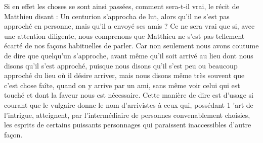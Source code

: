 Si en effet les choses se sont ainsi passées, comment sera-t-il vrai, le récit de Matthieu disant : Un centurion s'approcha de lut, alors qu’il ne s’est pas approché en personne, mais qu’il a envoyé ses amis ? Ce ne sera vrai que si, avec une attention diligente, nous comprenons que Matthieu ne s’est pas tellement écarté de nos façons habituelles de parler. Car non seulement nous avons coutume de dire que quelqu’un s’approche, avant même qu’il soit arrivé au lieu dont nous disons qu’il s’est approché, puisque nous disons qu’il s’est peu ou beaucoup approché du lieu où il désire arriver, mais nous disons même très souvent que c’est chose faîte, quand on y arrive par un ami, sans même voir celui qui est touché et dont la faveur nous est nécessaire. Cette manière de dire est d’usage si courant que le vulgaire donne le nom d’arrivistes à ceux qui, possédant 1 ’art de l’intrigue, atteignent, par l’intermédiaire de personnes convenablement choisies, les esprits de certains puissants personnages qui paraissent inaccessibles d’autre façon.
